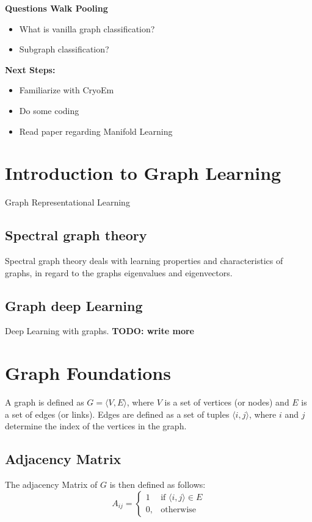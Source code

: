 \textbf{Questions Walk Pooling}
\begin{itemize}
    \item What is vanilla graph classification?
    \item Subgraph classification?
\end{itemize}


\textbf{Next Steps:}
\begin{itemize}
    \item Familiarize with CryoEm
    \item Do some coding
    \item Read paper regarding Manifold Learning
\end{itemize}

\section{Introduction to Graph Learning}

Graph Representational Learning


\subsection{Spectral graph theory}
Spectral graph theory \cite{SpectralGraphTheory} deals with learning properties and characteristics of graphs, in regard to
the graphs eigenvalues and eigenvectors. 

\subsection{Graph deep Learning}
Deep Learning with graphs.
\textbf{TODO: write more}


\section{Graph Foundations}
A graph is defined as  $G = \langle V,E \rangle$, where $V$ is a set of 
vertices (or nodes) and $E$ is a set of edges (or links). Edges are 
defined as a set of tuples $\langle i,j \rangle$, where $i$ and $j$ determine the 
index of the vertices in the graph.

\subsection{Adjacency Matrix}

The adjacency Matrix of $G$ is then defined as follows:
\begin{equation}
    A_{ij} =    
    \begin{cases}
        1  & \text{if } \langle i , j \rangle \in E \\
        0, & \text{otherwise}
    \end{cases}
\end{equation}

